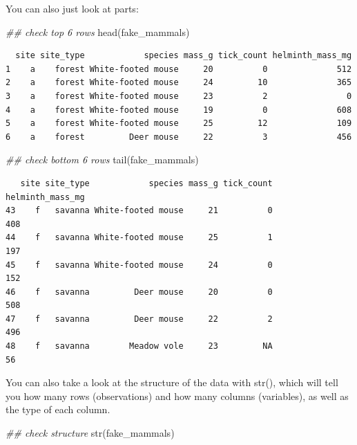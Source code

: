 \documentclass[
  letterpaper,
  DIV=11,
  numbers=noendperiod]{scrreprt}
\newenvironment{Shaded}{\begin{snugshade}}{\end{snugshade}}
\newcommand{\DocumentationTok}[1]{\textcolor[rgb]{0.37,0.37,0.37}{\textit{#1}}}
\newcommand{\FunctionTok}[1]{\textcolor[rgb]{0.28,0.35,0.67}{#1}}
\newcommand{\NormalTok}[1]{\textcolor[rgb]{0.00,0.23,0.31}{#1}}
\begin{document}
You can also just look at parts:

\begin{Shaded}
\begin{Highlighting}[]
\DocumentationTok{\#\# check top 6 rows}
\FunctionTok{head}\NormalTok{(fake\_mammals)}
\end{Highlighting}
\end{Shaded}

\begin{verbatim}
  site site_type            species mass_g tick_count helminth_mass_mg
1    a    forest White-footed mouse     20          0              512
2    a    forest White-footed mouse     24         10              365
3    a    forest White-footed mouse     23          2                0
4    a    forest White-footed mouse     19          0              608
5    a    forest White-footed mouse     25         12              109
6    a    forest         Deer mouse     22          3              456
\end{verbatim}

\begin{Shaded}
\begin{Highlighting}[]
\DocumentationTok{\#\# check bottom 6 rows}
\FunctionTok{tail}\NormalTok{(fake\_mammals)}
\end{Highlighting}
\end{Shaded}

\begin{verbatim}
   site site_type            species mass_g tick_count helminth_mass_mg
43    f   savanna White-footed mouse     21          0              408
44    f   savanna White-footed mouse     25          1              197
45    f   savanna White-footed mouse     24          0              152
46    f   savanna         Deer mouse     20          0              508
47    f   savanna         Deer mouse     22          2              496
48    f   savanna        Meadow vole     23         NA               56
\end{verbatim}

You can also take a look at the structure of the data with str(), which
will tell you how many rows (observations) and how many columns
(variables), as well as the type of each column.

\begin{Shaded}
\begin{Highlighting}[]
\DocumentationTok{\#\# check structure}
\FunctionTok{str}\NormalTok{(fake\_mammals)}
\end{Highlighting}
\end{Shaded}
\end{document}
